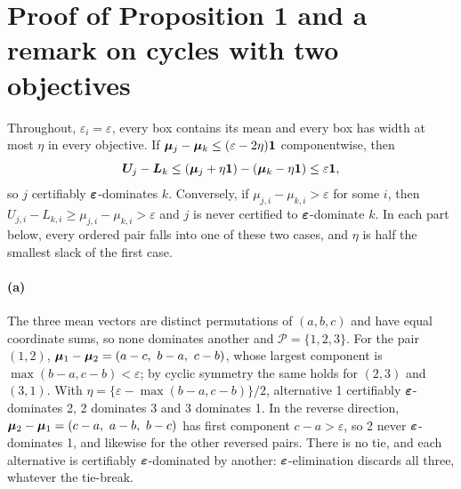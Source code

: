 \section{Proof of Proposition 1 and a remark on cycles with two objectives}\label{sec:proof-failure}

Throughout, $\varepsilon_i=\varepsilon$, every box contains its mean and every box has width at most $\eta$ in every objective. If $\bm{\mu}_j-\bm{\mu}_k\le(\varepsilon-2\eta)\bm1$ componentwise, then
\[
\bm U_j-\bm L_k\le(\bm{\mu}_j+\eta\bm1)-(\bm{\mu}_k-\eta\bm1)\le\varepsilon\bm1,
\]
so $j$ certifiably $\bm{\varepsilon}$-dominates $k$. Conversely, if $\mu_{j,i}-\mu_{k,i}>\varepsilon$ for some $i$, then $U_{j,i}-L_{k,i}\ge\mu_{j,i}-\mu_{k,i}>\varepsilon$ and $j$ is never certified to $\bm{\varepsilon}$-dominate $k$. In each part below, every ordered pair falls into one of these two cases, and $\eta$ is half the smallest slack of the first case.

\paragraph{(a)} The three mean vectors are distinct permutations of $(a,b,c)$ and have equal coordinate sums, so none dominates another and $\mathcal P=\{1,2,3\}$. For the pair $(1,2)$, $\bm{\mu}_1-\bm{\mu}_2=(a-c,\ b-a,\ c-b)$, whose largest component is $\max(b-a,c-b)<\varepsilon$; by cyclic symmetry the same holds for $(2,3)$ and $(3,1)$. With $\eta=\{\varepsilon-\max(b-a,c-b)\}/2$, alternative 1 certifiably $\bm{\varepsilon}$-dominates 2, 2 dominates 3 and 3 dominates 1. In the reverse direction, $\bm{\mu}_2-\bm{\mu}_1=(c-a,\ a-b,\ b-c)$ has first component $c-a>\varepsilon$, so 2 never $\bm{\varepsilon}$-dominates 1, and likewise for the other reversed pairs. There is no tie, and each alternative is certifiably $\bm{\varepsilon}$-dominated by another: $\bm{\varepsilon}$-elimination discards all three, whatever the tie-break.

